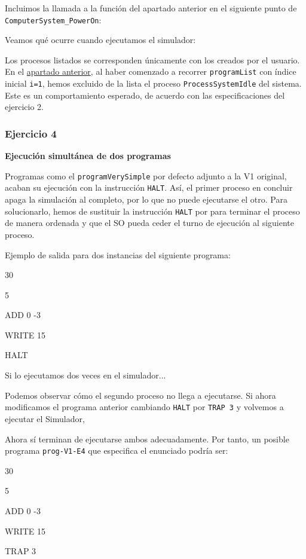 \documentclass[12pt,a4paper]{article}
\newcounter{unit}[section]
\newcounter{chapter}[unit]
\renewcommand{\thechapter}{\arabic{chapter}}
\renewcommand{\thesubsubsection}{\thechapter.\arabic{subsubsection}}
\newcommand{\result}[1]{%
  \subsubsection{#1}%
  \label{result:\thesubsubsection}
}
\begin{document}
\vspace{2mm}
Incluimos la llamada a la función del apartado anterior en el siguiente punto de \texttt{ComputerSystem\_PowerOn}:


\vspace{2mm} \noindent
Veamos qué ocurre cuando ejecutamos el simulador:
\begin{terminal}

\end{terminal}
Los procesos listados se corresponden únicamente con los creados por el usuario. En el \hyperref[result:1.2]{apartado anterior}, al haber comenzado a recorrer \texttt{programList} con índice inicial \texttt{i=1}, hemos excluido de la lista el proceso \texttt{ProcessSystemIdle} del sistema. Este es un comportamiento esperado, de acuerdo con las especificaciones del ejercicio 2.

\vspace{6mm}
\result{Ejercicio 4}
\textbf{Ejecución simultánea de dos programas}

\vspace{2mm}
Programas como el \texttt{programVerySimple} por defecto adjunto a la V1 original, acaban su ejecución con la instrucción \texttt{HALT}. Así, el primer proceso en concluir apaga la simulación al completo, por lo que no puede ejecutarse el otro. Para solucionarlo, hemos de sustituir  la instrucción \texttt{HALT} por  para terminar el proceso de manera ordenada y que el SO pueda ceder el turno de ejecución al siguiente proceso.

\vspace{2mm} \noindent
Ejemplo de salida para dos instancias del siguiente programa:
\begin{terminal}
  30

  5

  ADD 0 -3

  WRITE 15

  HALT
\end{terminal}
\noindent Si lo ejecutamos dos veces en el simulador...
\begin{terminal}

\end{terminal}
\noindent Podemos observar cómo el segundo proceso no llega a ejecutarse. Si ahora modificamos el programa anterior cambiando \texttt{HALT} por \texttt{TRAP 3} y volvemos a ejecutar el Simulador,
\begin{terminal}

\end{terminal}
Ahora sí terminan de ejecutarse ambos adecuadamente. Por tanto, un posible programa \texttt{prog-V1-E4} que especifica el enunciado podría ser:
\begin{terminal}
    30

  5

  ADD 0 -3

  WRITE 15

  TRAP 3
\end{terminal}
\end{document}
